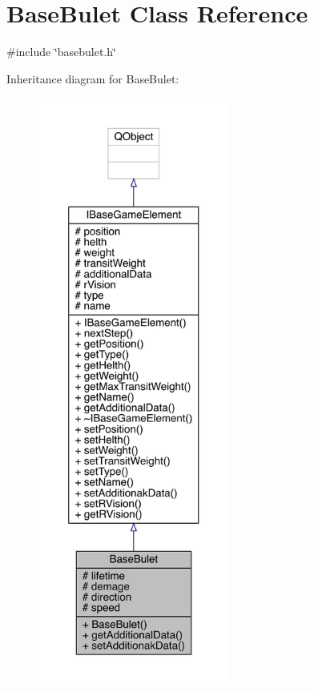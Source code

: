 \hypertarget{a00153}{}\section{Base\+Bulet Class Reference}
\label{a00153}


{\ttfamily \#include \char`\"{}basebulet.\+h\char`\"{}}



Inheritance diagram for Base\+Bulet\+:
\nopagebreak
\begin{figure}[H]
\begin{center}
\leavevmode
\includegraphics[height=550pt]{d7/d9a/a00152}
\end{center}
\end{figure}


